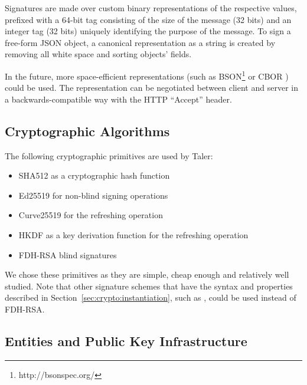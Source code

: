 Signatures are made over custom binary representations of the respective
values, prefixed with a 64-bit tag consisting of the size of the message (32
bits) and an integer tag (32 bits) uniquely identifying the purpose of the message.
To sign a free-form JSON object, a canonical representation as a string is
created by removing all white space and sorting objects' fields.

In the future, more space-efficient representations (such as BSON\footnote{http://bsonspec.org/} or CBOR \cite{rfc7049})
could be used.  The representation can be negotiated between client and server
in a backwards-compatible way with the HTTP ``Accept'' header.


\subsection{Cryptographic Algorithms}
The following cryptographic primitives are used by Taler:
\begin{itemize}
  \item SHA512 \cite{rfc4634} as a cryptographic hash function
  \item Ed25519 \cite{bernstein2006curve25519} for non-blind signing operations
  \item Curve25519 \cite{bernstein2006curve25519} for the refreshing operation
  \item HKDF \cite{rfc5869} as a key derivation function for the refreshing operation
  \item FDH-RSA blind signatures \cite{bellare2003onemore}
\end{itemize}

We chose these primitives as they are simple, cheap enough and relatively well
studied.  Note that other signature schemes that have the syntax and properties
described in Section~\ref{sec:crypto:instantiation}, such as
\cite{boldyreva2003threshold}, could be used instead of FDH-RSA.  

\subsection{Entities and Public Key Infrastructure}

